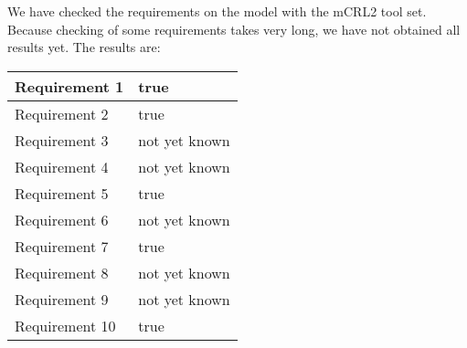 We have checked the requirements on the model with the mCRL2 tool set. Because checking of some requirements takes very long, we have not obtained all results yet. The results are:
\begin{tabular}{|l|l|}
\hline
Requirement 1 & true \\
\hline
Requirement 2 & true \\
\hline
Requirement 3 & not yet known \\
\hline
Requirement 4 & not yet known \\
\hline
Requirement 5 & true \\
\hline
Requirement 6 & not yet known \\
\hline
Requirement 7 & true \\
\hline
Requirement 8 & not yet known \\
\hline
Requirement 9 & not yet known \\
\hline
Requirement 10 & true \\
\hline
\end{tabular}